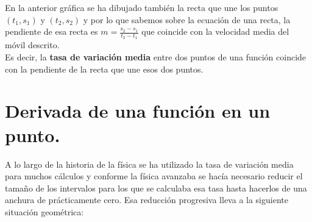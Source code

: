 \documentclass[a4paper,11pt,answers]{exam}
\begin{document}
En la anterior gráfica se ha dibujado también la recta que une los puntos $(t_1, s_1)$ y $(t_2, s_2)$ y por lo que sabemos sobre la ecuación de una recta, la pendiente de esa recta es $m = \frac{s_2 - s_1}{t_2 - t_1}$ que coincide con la velocidad media del móvil descrito.\\
Es decir, la \textbf{tasa de variación media} entre dos puntos de una función coincide con la pendiente de la recta que une esos dos puntos.

\section{Derivada de una función en un punto.}
A lo largo de la historia de la física se ha utilizado la tasa de variación media para muchos cálculos y conforme la física avanzaba se hacía necesario reducir el tamaño de los intervalos para los que se calculaba esa tasa hasta hacerlos de una anchura de prácticamente cero. Esa reducción progresiva lleva a la siguiente situación geométrica:
\end{document}

